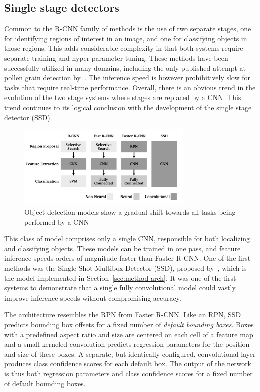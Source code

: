 \subsection{Single stage detectors}\label{sec:ssd}
Common to the R-CNN family of methods is the use of two separate stages, one for identifying regions of interest in an image, and one for classifying objects in those regions.
This adds considerable complexity in that both systems require separate training and hyper-parameter tuning.
These methods have been successfully utilized in many domains, including the only published attempt at pollen grain detection by\ \cite{gallardo_caballero_precise_2019}.
The inference speed is however prohibitively slow for tasks that require real-time performance.
Overall, there is an obvious trend in the evolution of the two stage systems where stages are replaced by a CNN\@.
This trend continues to its logical conclusion with the development of the single stage detector (SSD).

\begin{figure}[htbp]
  \centering
  \includegraphics[width=0.75\textwidth]{figs/related/detector_evolution.pdf}
  \caption[Evolution of object detection models]{Object detection models show a gradual shift towards all tasks being performed by a CNN}\label{fig:related-detectors}
\end{figure}

This class of model comprises only a single CNN, responsible for both localizing and classifying objects.
These models can be trained in one pass, and feature inference speeds orders of magnitude faster than Faster R-CNN\@.
One of the first methods was the Single Shot Multibox Detector (SSD), proposed by\ \textcite{liu_ssd_2016}, which is the model implemented in Section~\ref{sec:method-arch}.
It was one of the first systems to demonstrate that a single fully convolutional model could vastly improve inference speeds without compromising accuracy.

The architecture resembles the RPN from Faster R-CNN\@.
Like an RPN, SSD predicts bounding box offsets for a fixed number of \textit{default bounding boxes}.
Boxes with a predefined aspect ratio and size are centered on each cell of a feature map and a small-kerneled convolution predicts regression parameters for the position and size of these boxes.
A separate, but identically configured, convolutional layer produces class confidence scores for each default box.
The output of the network is thus both regression parameters and class confidence scores for a fixed number of default bounding boxes.


